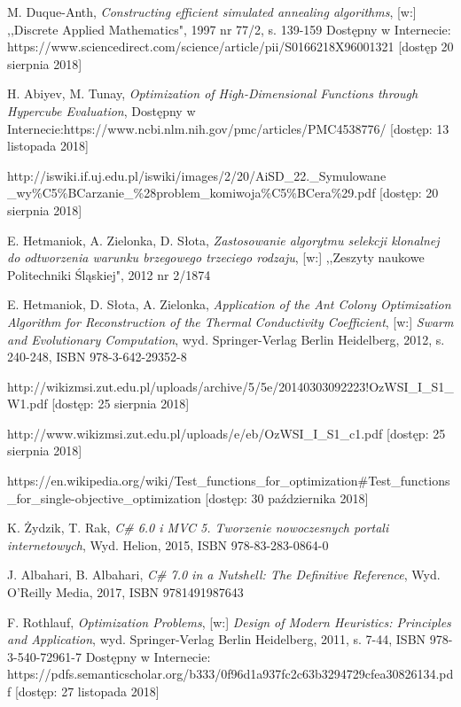 \documentclass[twoside]{projektInzynierskiMS1}
\begin{document}
\begin{thebibliography}{12}

 M. Duque-Anth, \textit{Constructing efficient simulated annealing algorithms}, [w:] ,,Discrete Applied Mathematics", 1997 nr 77/2, s. 139-159 Dostępny w Internecie: https://www.sciencedirect.com/science/article/pii/S0166218X96001321
[dostęp 20 sierpnia 2018]

 H. Abiyev, M. Tunay, \textit{Optimization of High-Dimensional Functions through Hypercube Evaluation}, Dostępny w Internecie:https://www.ncbi.nlm.nih.gov/pmc/articles/PMC4538776/
[dostęp: 13 listopada 2018]

 http://iswiki.if.uj.edu.pl/iswiki/images/2/20/AiSD\_22.\_Symulowane \_wy\%C5\%BCarzanie\_\%28problem\_komiwoja\%C5\%BCera\%29.pdf [dostęp: 20 sierpnia 2018]

E. Hetmaniok, A. Zielonka, D. Słota, \textit{Zastosowanie algorytmu selekcji klonalnej do odtworzenia warunku brzegowego trzeciego rodzaju}, [w:] ,,Zeszyty naukowe Politechniki Śląskiej", 2012 nr 2/1874

 E. Hetmaniok, D. Słota, A. Zielonka, \textit{Application of the Ant Colony Optimization Algorithm for Reconstruction of the Thermal Conductivity Coefficient}, [w:] \textit{Swarm and Evolutionary Computation}, wyd. Springer-Verlag Berlin Heidelberg, 2012,  s. 240-248, ISBN 978-3-642-29352-8

 http://wikizmsi.zut.edu.pl/uploads/archive/5/5e/20140303092223!OzWSI\_I\_S1\_W1.pdf
[dostęp: 25 sierpnia 2018]

 http://www.wikizmsi.zut.edu.pl/uploads/e/eb/OzWSI\_I\_S1\_c1.pdf
[dostęp: 25 sierpnia 2018]

 https://en.wikipedia.org/wiki/Test\_functions\_for\_optimization\#Test\_functions\_for\_single-objective\_optimization [dostęp: 30 października 2018]


 K. Żydzik, T. Rak,  \textit{C\# 6.0 i MVC 5. Tworzenie nowoczesnych portali internetowych}, Wyd. Helion, 2015, ISBN 
978-83-283-0864-0

 J. Albahari, B. Albahari, \textit{C\# 7.0 in a Nutshell: The Definitive Reference}, Wyd. O'Reilly Media, 2017, ISBN 9781491987643

 F. Rothlauf, \textit{Optimization Problems}, [w:] \textit{Design of Modern Heuristics: Principles and Application}, wyd. Springer-Verlag Berlin Heidelberg, 2011, s. 7-44, ISBN 978-3-540-72961-7
Dostępny w Internecie: https://pdfs.semanticscholar.org/b333/0f96d1a937fc2c63b3294729cfea30826134.pdf
[dostęp: 27 listopada 2018]


\end{thebibliography}
\end{document}
